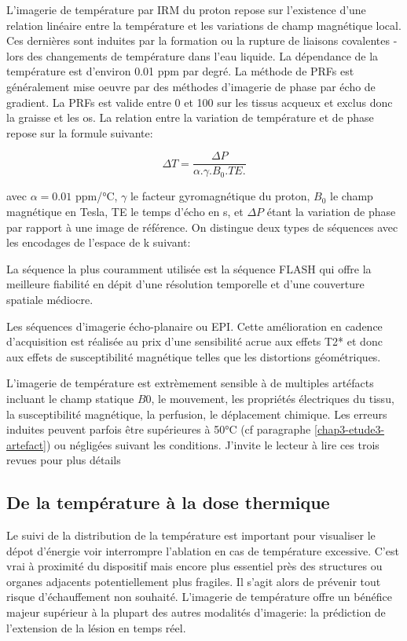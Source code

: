 
L'imagerie de température par IRM du proton  repose sur l'existence d'une relation linéaire entre la température et les variations de champ magnétique local. Ces dernières sont induites par la formation ou la rupture de liaisons covalentes - lors des changements de température dans l'eau liquide. La dépendance de la température est d'environ 0.01 \ac{ppm} par degré. La méthode de \ac{PRFs} est généralement mise oeuvre par des méthodes d'imagerie de phase par écho de gradient. La \ac{PRFs} est valide entre 0 et 100 \textcelsius sur les tissus acqueux et exclus donc la graisse et les os. La relation entre la variation de température et de phase repose sur la formule suivante: 

\[
\Delta T= \frac{\Delta P}{\alpha.\gamma.B_{0}.TE.}
\]

avec $\alpha=0.01$ ppm/°C, $\gamma$ le facteur gyromagnétique du proton, $B_{0}$ le champ magnétique en Tesla, TE le temps d'écho en s, et $\Delta P$ étant la variation de phase par rapport à une image de référence. On distingue deux types de séquences avec les encodages de l'espace de k suivant:

\begin{description}
\item La séquence la plus couramment utilisée est la séquence \ac{FLASH} qui offre la meilleure fiabilité en dépit d'une résolution temporelle et d'une couverture spatiale médiocre.
\item Les séquences d'imagerie écho-planaire ou \ac{EPI}. Cette amélioration en cadence d'acquisition est réalisée au prix d'une sensibilité acrue aux effets T2* et donc aux effets de susceptibilité magnétique telles que les distortions géométriques.
\end{description}

L'imagerie de température est extrèmement sensible à de multiples artéfacts incluant le champ statique $B0$, le mouvement, les propriétés électriques du tissu, la susceptibilité magnétique, la perfusion, le déplacement chimique. Les erreurs induites peuvent parfois être supérieures à 50°C (cf paragraphe \ref{chap3-etude3-artefact}) ou négligées suivant les conditions. J'invite le lecteur à lire ces trois revues pour plus détails \cite{winter2016magnetic,odeen2019magnetic,lutz2020contactless}

\subsection{De la température à la dose thermique}

Le suivi de la distribution de la température est important pour visualiser le dépot d'énergie voir interrompre l'ablation en cas de température excessive. C'est vrai à proximité du dispositif mais encore plus essentiel près des structures ou organes adjacents potentiellement plus fragiles. Il s'agit alors de prévenir tout risque d'échauffement non souhaité. L'imagerie de température offre un bénéfice majeur supérieur à la plupart des autres modalités d'imagerie: la prédiction de l'extension de la lésion en temps réel.\\
